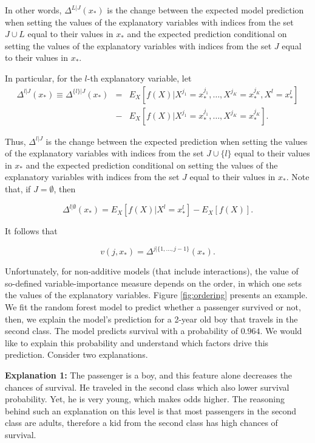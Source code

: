 \documentclass[12pt,]{krantz}
\begin{document}
In other words, \(\Delta^{L|J}(x_*)\) is the change between the expected model prediction when setting the values of the explanatory variables with indices from the set \(J \cup L\) equal to their values in \(x_*\) and the expected prediction conditional on setting the values of the explanatory variables with indices from the set \(J\) equal to their values in \(x_*\).

In particular, for the \(l\)-th explanatory variable, let
\begin{eqnarray}
\Delta^{l|J}(x_*) \equiv \Delta^{\{l\}|J}(x_*) &=& E_X[f(X) | X^{j_1} = x_*^{j_1},\ldots,X^{j_K} = x_*^{j_K}, X^{l} = x_*^{l}]\\
&-& E_X[f(X) | X^{j_1} = x_*^{j_1},\ldots,X^{j_K} = x_*^{j_K}].
\end{eqnarray}

Thus, \(\Delta^{l|J}\) is the change between the expected prediction when setting the values of the explanatory variables with indices from the set \(J \cup \{l\}\) equal to their values in \(x_*\) and the expected prediction conditional on setting the values of the explanatory variables with indices from the set \(J\) equal to their values in \(x_*\). Note that, if \(J=\emptyset\), then

\begin{equation}
\Delta^{l|\emptyset}(x_*) = E_X[f(X) | X^{l} = x_*^{l}] - E_X[f(X)].
\label{eq:deltaBreakDownAdditive}
\end{equation}

It follows that

\begin{equation}
v(j, x_*) = \Delta^{j|\{1,  ..., j-1\}}(x_*).
\end{equation}

Unfortunately, for non-additive models (that include interactions), the value of so-defined variable-importance measure depends on the order, in which one sets the values of the explanatory variables. Figure \ref{fig:ordering} presents an example.
We fit the random forest model to predict whether a passenger survived or not, then, we explain the model's prediction for a 2-year old boy that travels in the second class. The model predicts survival with a probability of \(0.964\). We would like to explain this probability and understand which factors drive this prediction. Consider two explanations.

\textbf{Explanation 1:}
The passenger is a boy, and this feature alone decreases the chances of survival. He traveled in the second class which also lower survival probability.
Yet, he is very young, which makes odds higher. The reasoning behind such an explanation on this level is that most passengers in the second class are adults, therefore a kid from the second class has high chances of survival.
\end{document}
